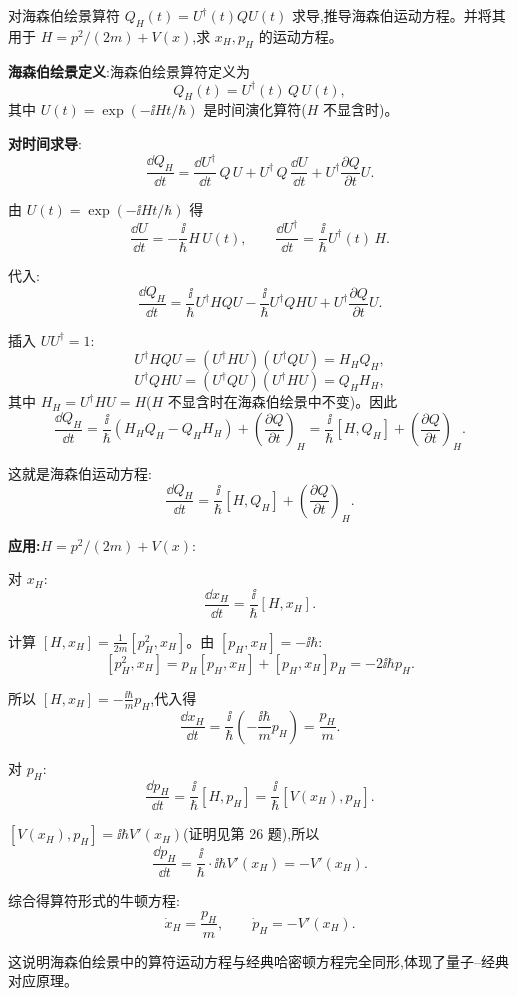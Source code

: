 \begin{question}
对海森伯绘景算符 $Q_H(t)=U^\dagger(t)QU(t)$ 求导,推导海森伯运动方程。并将其用于 $H=p^2/(2m)+V(x)$,求 $x_H,p_H$ 的运动方程。
\begin{solution}
	\textbf{海森伯绘景定义}:海森伯绘景算符定义为
	\[
	Q_H(t) = U^\dagger(t)\,Q\,U(t),
	\]
	其中 $U(t)=\exp(-\ii Ht/\hbar)$ 是时间演化算符($H$ 不显含时)。

	\textbf{对时间求导}:
	\[
	\frac{\dd Q_H}{\dd t} = \frac{\dd U^\dagger}{\dd t}\,Q\,U + U^\dagger\,Q\,\frac{\dd U}{\dd t} + U^\dagger\frac{\partial Q}{\partial t}U.
	\]

	由 $U(t)=\exp(-\ii Ht/\hbar)$ 得
	\[
	\frac{\dd U}{\dd t} = -\frac{\ii}{\hbar}H\,U(t),\qquad
	\frac{\dd U^\dagger}{\dd t} = \frac{\ii}{\hbar}U^\dagger(t)\,H.
	\]

	代入:
	\[
	\frac{\dd Q_H}{\dd t} = \frac{\ii}{\hbar}U^\dagger H Q U - \frac{\ii}{\hbar}U^\dagger Q H U + U^\dagger\frac{\partial Q}{\partial t}U.
	\]

	插入 $UU^\dagger=1$:
	\[
	U^\dagger H Q U = (U^\dagger H U)(U^\dagger Q U) = H_H Q_H,
	\]
	\[
	U^\dagger Q H U = (U^\dagger Q U)(U^\dagger H U) = Q_H H_H,
	\]
	其中 $H_H=U^\dagger H U = H$($H$ 不显含时在海森伯绘景中不变)。因此
	\[
	\frac{\dd Q_H}{\dd t} = \frac{\ii}{\hbar}(H_H Q_H - Q_H H_H) + \left(\frac{\partial Q}{\partial t}\right)_H
	= \frac{\ii}{\hbar}[H,Q_H] + \left(\frac{\partial Q}{\partial t}\right)_H.
	\]

	这就是海森伯运动方程:
	\[
	\boxed{\frac{\dd Q_H}{\dd t} = \frac{\ii}{\hbar}[H,Q_H] + \left(\frac{\partial Q}{\partial t}\right)_H}.
	\]

	\textbf{应用:$H=p^2/(2m)+V(x)$}:

	对 $x_H$:
	\[
	\frac{\dd x_H}{\dd t} = \frac{\ii}{\hbar}[H,x_H].
	\]

	计算 $[H,x_H] = \frac{1}{2m}[p_H^2,x_H]$。由 $[p_H,x_H]=-\ii\hbar$:
	\[
	[p_H^2,x_H] = p_H[p_H,x_H] + [p_H,x_H]p_H = -2\ii\hbar p_H.
	\]

	所以 $[H,x_H] = -\frac{\ii\hbar}{m}p_H$,代入得
	\[
	\frac{\dd x_H}{\dd t} = \frac{\ii}{\hbar}\left(-\frac{\ii\hbar}{m}p_H\right) = \frac{p_H}{m}.
	\]

	对 $p_H$:
	\[
	\frac{\dd p_H}{\dd t} = \frac{\ii}{\hbar}[H,p_H] = \frac{\ii}{\hbar}[V(x_H),p_H].
	\]

	$[V(x_H),p_H] = \ii\hbar V'(x_H)$(证明见第 26 题),所以
	\[
	\frac{\dd p_H}{\dd t} = \frac{\ii}{\hbar}\cdot\ii\hbar V'(x_H) = -V'(x_H).
	\]

	综合得算符形式的牛顿方程:
	\[
	\boxed{\dot x_H = \frac{p_H}{m}},\qquad
	\boxed{\dot p_H = -V'(x_H)}.
	\]

	这说明海森伯绘景中的算符运动方程与经典哈密顿方程完全同形,体现了量子--经典对应原理。
	\end{solution}
\end{question}

